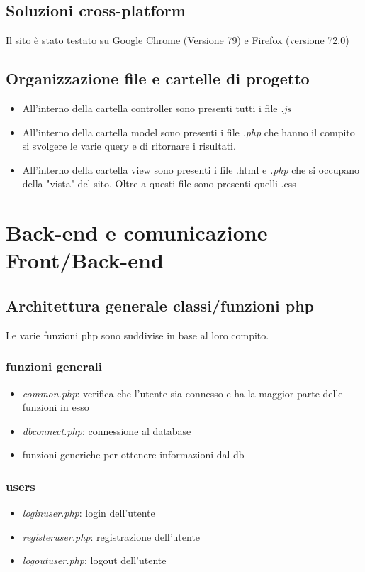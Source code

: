 \documentclass[14pt]{extarticle}
\begin{document}
\subsection{Soluzioni cross-platform}
Il sito è stato testato su Google Chrome (Versione 79) e Firefox (versione 72.0)

\subsection{Organizzazione file e cartelle di progetto}
\begin{itemize}
    \item All'interno della cartella controller sono presenti tutti i file \textit{.js}
    \item All'interno della cartella model sono presenti i file \textit{.php} che
    hanno il compito si svolgere le varie query e di ritornare i risultati.
    \item All'interno della cartella view sono presenti i file .html e \textit{.php} che
    si occupano della "vista" del sito. Oltre a questi file sono presenti
    quelli .css
\end{itemize}

\section{Back-end e comunicazione Front/Back-end}
\subsection{Architettura generale classi/funzioni php}
Le varie funzioni php sono suddivise in base al loro compito.

\subsubsection*{funzioni generali}
\begin{itemize}
    \item \textit{common.php}: verifica che l'utente sia connesso e ha la maggior parte delle funzioni in esso
    \item \textit{dbconnect.php}: connessione al database
    \item funzioni generiche per ottenere informazioni dal db
\end{itemize}

\subsubsection*{users}
\begin{itemize}
    \item \textit{loginuser.php}: login dell'utente
    \item \textit{registeruser.php}: registrazione dell'utente
    \item \textit{logoutuser.php}: logout dell'utente
\end{itemize}
\end{document}
